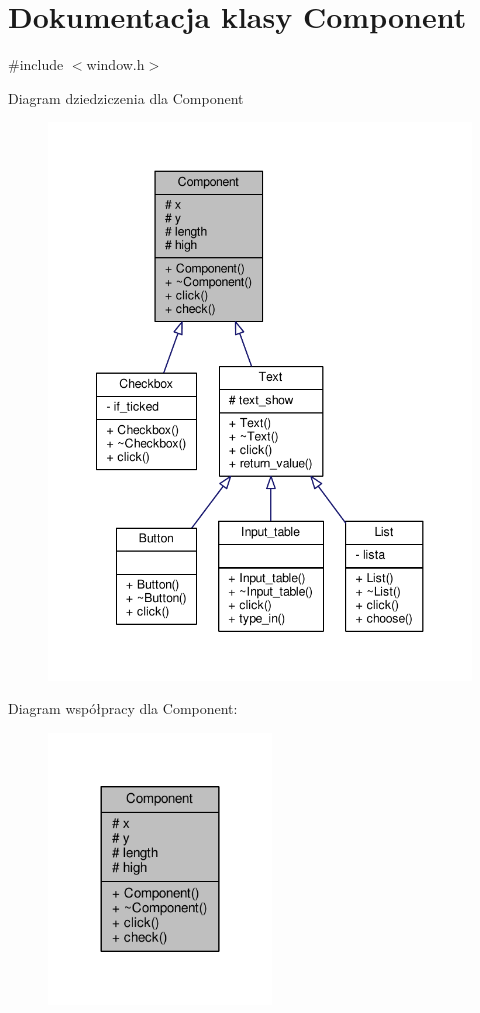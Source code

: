 \hypertarget{classComponent}{}\section{Dokumentacja klasy Component}
\label{classComponent}


{\ttfamily \#include $<$window.\+h$>$}



Diagram dziedziczenia dla Component
\nopagebreak
\begin{figure}[H]
\begin{center}
\leavevmode
\includegraphics[width=348pt]{classComponent__inherit__graph}
\end{center}
\end{figure}


Diagram współpracy dla Component\+:
\nopagebreak
\begin{figure}[H]
\begin{center}
\leavevmode
\includegraphics[width=168pt]{classComponent__coll__graph}
\end{center}
\end{figure}
